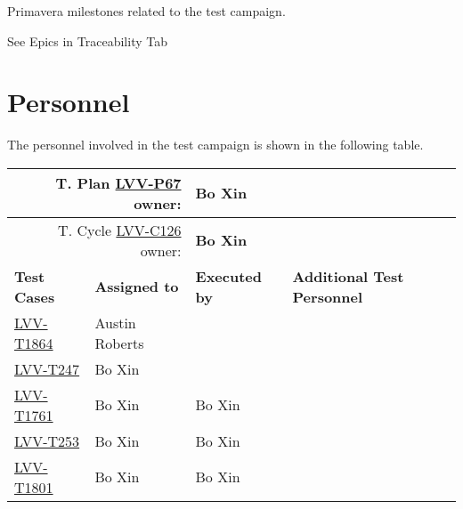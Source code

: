 \documentclass[SE,lsstdraft,STR,toc]{lsstdoc}
\begin{document}
Primavera milestones related to the test campaign.

See Epics in Traceability Tab


\newpage
\section{Personnel}
\label{sect:personnel}

The personnel involved in the test campaign is shown in the following table.

{\small
\begin{longtable}{p{3cm}p{3cm}p{3cm}p{6cm}}
\hline
\multicolumn{2}{r}{T. Plan \href{https://jira.lsstcorp.org/secure/Tests.jspa\#/testPlan/LVV-P67}{LVV-P67} owner:} &
\multicolumn{2}{l}{\textbf{ Bo Xin } }\\\hline
\multicolumn{2}{r}{T. Cycle \href{https://jira.lsstcorp.org/secure/Tests.jspa\#/testCycle/LVV-C126}{LVV-C126} owner:} &
\multicolumn{2}{l}{\textbf{
Bo Xin }
} \\\hline
\textbf{Test Cases} & \textbf{Assigned to} & \textbf{Executed by} & \textbf{Additional Test Personnel} \\ \hline
\href{https://jira.lsstcorp.org/secure/Tests.jspa#/testCase/LVV-T1864}{LVV-T1864}
& {\small Austin Roberts } & {\small  } &
\begin{minipage}[]{6cm}
\smallskip
{\small  }
\medskip
\end{minipage}
\\ \hline
\href{https://jira.lsstcorp.org/secure/Tests.jspa#/testCase/LVV-T247}{LVV-T247}
& {\small Bo Xin } & {\small  } &
\begin{minipage}[]{6cm}
\smallskip
{\small  }
\medskip
\end{minipage}
\\ \hline
\href{https://jira.lsstcorp.org/secure/Tests.jspa#/testCase/LVV-T1761}{LVV-T1761}
& {\small Bo Xin } & {\small Bo Xin } &
\begin{minipage}[]{6cm}
\smallskip
{\small  }
\medskip
\end{minipage}
\\ \hline
\href{https://jira.lsstcorp.org/secure/Tests.jspa#/testCase/LVV-T253}{LVV-T253}
& {\small Bo Xin } & {\small Bo Xin } &
\begin{minipage}[]{6cm}
\smallskip
{\small  }
\medskip
\end{minipage}
\\ \hline
\href{https://jira.lsstcorp.org/secure/Tests.jspa#/testCase/LVV-T1801}{LVV-T1801}
& {\small Bo Xin } & {\small Bo Xin } &

\end{longtable}}
\end{document}
